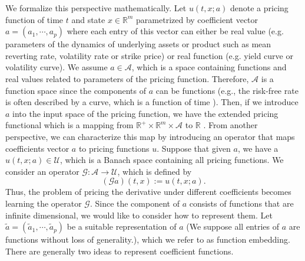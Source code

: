 \documentclass[11pt,a4paper]{article}
\theoremstyle{remark}
\begin{document}
    We formalize this perspective mathematically. Let $u(t,x; a)$ denote a pricing function of time $t$ and state $x \in \mathbb{R}^m$ parametrized by coefficient vector $a = (a_1,\cdots,a_p)$ where each entry of this vector can either be real value (e.g. parameters of the dynamics of underlying assets or product such as mean reverting rate, volatility rate or strike price) or real function (e.g. yield curve or volatility curve). We assume $a\in \mathcal{A}$, which is a space containing functions and real values related to parameters of the pricing function. Therefore, $\mathcal{A}$ is a function space since the components of $a$ can be functions (e.g., the risk-free rate is often described by a curve, which is a function of time ). Then, if we introduce $a$ into the input space of the pricing function, we have the extended pricing functional which is a mapping from  $\mathbb{R}^+ \times \mathbb{R}^m \times \mathcal{A}$ to $\mathbb{R}$ . From another perspective, we can characterize this map by introducing an operator that maps coefficients vector $a$ to pricing functions $u$. Suppose that given $a$, we have a $u(t,x; a)\in \mathcal{U}$, which is a Banach space containing all pricing functions. We consider an operator $\mathcal{G}: \mathcal{A} \rightarrow \mathcal{U}$, which is defined by
    \begin{equation}
    	(\mathcal{G}a)(t, x) := u(t,x; a). \label{eq:operator}
    \end{equation}
    Thus, the problem of pricing the derivative under different coefficients becomes learning the operator $\mathcal{G}$.  Since the component of $a$ consists of functions that are infinite dimensional, we would like to consider how to represent them. Let $\tilde{a} = (\tilde{a}_1,\cdots,\tilde{a}_p)$ be a suitable representation of $a$ (We suppose all entries of $a$ are functions without loss of generality.), which we refer to as function embedding. There are generally two ideas to represent coefficient functions. 
\end{document}
